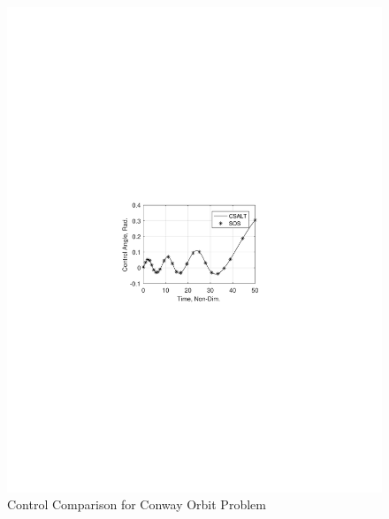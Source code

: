 \documentclass[ISTS  ]{tjsass} %
\begin{document}
\begin{figure}
    \centering
    \includegraphics[width=\columnwidth]{../Figures/ConwayOrbit_ControlCompare}
    \caption{Control Comparison for Conway Orbit Problem}
    \label{fig:conway_control}
\end{figure}
\end{document}
